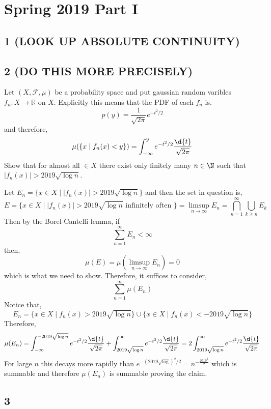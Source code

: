\documentclass[12pt]{article}
\newcommand{\R}{\mathbb{R}}
\renewcommand{\F}{\mathcal{F}}
\begin{document}
\section{Spring 2019 Part I}

\subsection{1 (LOOK UP ABSOLUTE CONTINUITY)}

\subsection{2 (DO THIS MORE PRECISELY)}

\begin{exercise}
Let $(X, \F, \mu)$ be a probability space and put gaussian random varibles $f_n : X \to \R$ on $X$. Explicitly this means that the PDF of each $f_n$ is.
\[ p(y) = \frac{1}{\sqrt{2 \pi}} e^{-t^2/2} \]
and therefore,
\[ \mu(\{x \mid f_n(x) < y \}) = \int_{-\infty}^y e^{-t^2/2} \frac{\d{t}}{\sqrt{2 \pi}} \]
Show that for almost all $ \in X$ there exist only finitely many $n \in \N$ such that $|f_n(x)| > 2019 \sqrt{\log{n}}$.
\end{exercise}

Let $E_n = \{ x \in X \mid |f_n(x)| > 2019 \sqrt{\log{n}} \}$ and then the set in question is,
\[ E = \{ x \in X \mid |f_n(x)| > 2019 \sqrt{\log{n}} \text{ infinitely often } \} = \limsup_{n \to \infty} E_n = \bigcap_{n = 1}^\infty \bigcup_{k \ge n} E_k \]
Then by the Borel-Cantelli lemma, if
\[ \sum_{n = 1}^\infty E_n < \infty \]
then,
\[ \mu(E) = \mu \left( \limsup_{n \to \infty} E_n \right) = 0 \]
which is what we need to show. Therefore, it suffices to consider,
\[ \sum_{n = 1}^\infty \mu(E_n) \]
Notice that,
\[ E_n = \{ x \in X \mid f_n(x) > 2019 \sqrt{\log{n}} \} \cup \{ x \in X \mid f_n(x) < - 2019 \sqrt{\log{n}} \} \]
Therefore,
\[ \mu(E_n) = \int_{-\infty}^{-2019 \sqrt{\log{n}}} e^{-t^2/2} \frac{\d{t}}{\sqrt{2 \pi}} + \int_{2019 \sqrt{\log{n}}}^{\infty} e^{-t^2/2} \frac{\d{t}}{\sqrt{2 \pi}} = 2 \int_{2019 \sqrt{\log{n}}}^{\infty} e^{-t^2/2} \frac{\d{t}}{\sqrt{2 \pi}} \]
For large $n$ this decays more rapidly than $e^{-(2019\sqrt{\log})^2/2} = n^{-\frac{2019^2}{2}}$
which is summable and therefore $\mu(E_n)$ is summable proving the claim.

\subsection{3}
\end{document}
